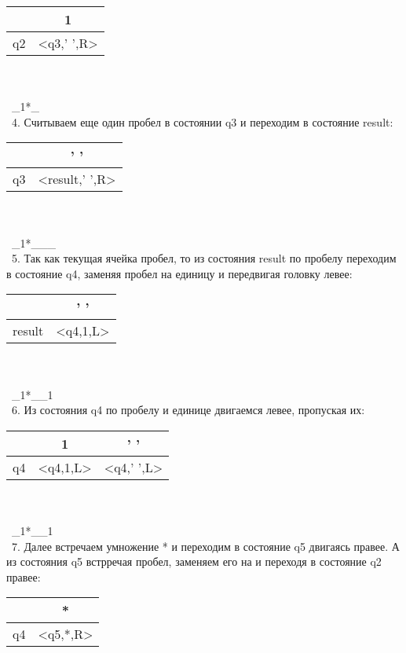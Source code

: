 \documentclass[a4paper]{article}
\begin{document}
\begin{enumerate}
\begin{tabular}{|*{2}{c|}}
\textbf{ } & 1 \\
\hline\hline
q2 & <q3,' ',R>\\
\end{tabular}
\\ \\
\ \_1*\_ \\
\ 4. Считываем еще один пробел в состоянии q3 и переходим в состояние result: \\
\begin{tabular}{|*{2}{c|}}
\textbf{ } & ' ' \\
\hline\hline
q3 & <result,' ',R>\\
\end{tabular}
\\ \\
\ \_1*\_\_\_ \\
\ 5. Так как текущая ячейка пробел, то из состояния result по пробелу переходим в состояние q4, заменяя пробел на единицу и передвигая головку левее: \\
\begin{tabular}{|*{2}{c|}}
\textbf{ } & ' ' \\
\hline\hline
result &<q4,1,L>\\
\end{tabular}
\\ \\
\ \_1*\_\_1\\
\ 6. Из состояния q4 по пробелу и единице двигаемся левее, пропуская их: \\
\begin{tabular}{|*{3}{c|}}
\textbf{ }  & 1 & ' ' \\
\hline\hline
q4 & <q4,1,L>&<q4,' ',L> \\
\end{tabular}
\\ \\
\ \_1*\_\_1\\
\ 7. Далее встречаем умножение * и переходим в состояние q5 двигаясь правее. А из состояния q5 встрречая пробел, заменяем его на  и переходя в состояние q2 правее: \\
\begin{tabular}{|*{2}{c|}}
\textbf{ }  & * \\
\hline\hline
q4 & <q5,*,R> \\
\end{tabular}\\ \\
\begin{tabular}{|*{2}{c|}}

\end{tabular}
\end{enumerate}
\end{document}
